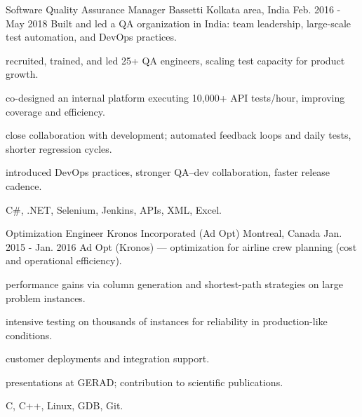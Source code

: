 \begin{cventries}
  \cventrywithintro
    {Software Quality Assurance Manager} %
    {Bassetti} %
    {Kolkata area, India} %
    {Feb. 2016 - May 2018} %
    {Built and led a QA organization in India: team leadership, large-scale test automation, and DevOps practices.} %
    {
      \begin{cvitemsafterintro}
        \item { recruited, trained, and led 25+ QA engineers, scaling test capacity for product growth.}
        \item { co-designed an internal platform executing 10,000+ API tests/hour, improving coverage and efficiency.}
        \item { close collaboration with development; automated feedback loops and daily tests, shorter regression cycles.}
        \item { introduced DevOps practices, stronger QA--dev collaboration, faster release cadence.}
      \end{cvitemsafterintro}
    }
    {C\#, .NET, Selenium, Jenkins, APIs, XML, Excel.}

  \cventrywithintro
    {Optimization Engineer} %
    {Kronos Incorporated (Ad Opt)} %
    {Montreal, Canada} %
    {Jan. 2015 - Jan. 2016} %
    {Ad Opt (Kronos) --- optimization for airline crew planning (cost and operational efficiency).} %
    {
      \begin{cvitemsafterintro}
        \item { performance gains via column generation and shortest-path strategies on large problem instances.}
        \item { intensive testing on thousands of instances for reliability in production-like conditions.}
        \item { customer deployments and integration support.}
        \item { presentations at GERAD; contribution to scientific publications.}
      \end{cvitemsafterintro}
    }
    {C, C++, Linux, GDB, Git.}

\end{cventries}
